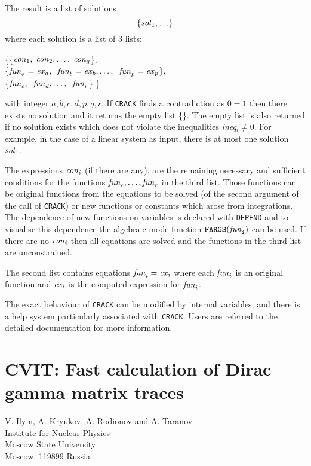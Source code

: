 \documentclass[11pt,letterpaper]{book}
\begin{document}
The result is a list of solutions
\[      \{{\it sol}_1, \ldots \}  \]
where each solution is a list of 3 lists:
\begin{tabbing}
       \{\=\{${\it con}_1, \; {\it con}_2, \ldots , \; {\it con}_q$\}, \\
         \>\{${\it fun}_a={\it ex}_a, \;\;
{\it fun}_b={\it ex}_b, \ldots , \;\; {\it fun}_p={\it ex}_p$\},\=  \\
         \>\{${\it fun}_c, \;\; {\it fun}_d, \ldots , \;\; {\it fun}_r$\} \>\}
\end{tabbing}
with integer $a, b, c, d, p, q, r.$
If {\tt CRACK} finds a contradiction as $0=1$ then there exists no
solution and it returns the empty list \{\}.
The empty list is also returned if no solution exists
which does not violate the inequalities
{\it ineq}$_i \neq 0.$
For example, in the case of a linear system as input, there is
at most one solution ${\it sol}_1$.

The expressions ${\it con}_i$ (if there are any), are the
remaining necessary and sufficient conditions for the functions
${\it fun}_c,\ldots,{\it fun}_r$ in the third list.  Those
functions can be original functions from the equations to be
solved (of the second argument of the call of {\tt CRACK}) or new
functions or constants which arose from integrations.
The dependence of new functions on variables is declared with {\tt DEPEND}
and to visualise this dependence the algebraic mode function
${\tt FARGS({\it fun}_i)}$ can be used.
If there are no ${\it con}_i$ then all equations are solved and the
functions in the third list are unconstrained.

The second list contains
equations ${\it fun}_i={\it ex}_i$ where each ${\it fun}_i$ is an
original function and ${\it ex}_i$ is the computed expression
for ${\it fun}_i$.

The exact behaviour of {\tt CRACK} can be modified by internal
variables, and there is a help system particularly associated with
{\tt CRACK}.  Users are referred to the detailed documentation for
more information.

\chapter[CVIT:Dirac gamma matrix traces]%
        {CVIT: Fast calculation of Dirac gamma matrix traces}
\label{CVIT}

{\footnotesize
\begin{center}
V. Ilyin, A. Kryukov, A. Rodionov and A. Taranov \\
Institute for Nuclear Physics \\
Moscow State University  \\
Moscow, 119899 Russia
\end{center}
}
\end{document}
